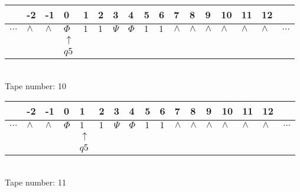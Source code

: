 \documentclass{article}
\begin{document}
\begin{table}[H]
\centering
\begin{tabular}{lllllllllllllllll}
 & -2 & -1 & 0 & 1 & 2 & 3 & 4 & 5 & 6 & 7 & 8 & 9 & 10 & 11 & 12 & \\
\hline
$...$ & \multicolumn{1}{|l|}{$\wedge$} & \multicolumn{1}{|l|}{$\wedge$} & \multicolumn{1}{|l|}{$\Phi$} & \multicolumn{1}{|l|}{$1$} & \multicolumn{1}{|l|}{$1$} & \multicolumn{1}{|l|}{$\Psi$} & \multicolumn{1}{|l|}{$\Phi$} & \multicolumn{1}{|l|}{$1$} & \multicolumn{1}{|l|}{$1$} & \multicolumn{1}{|l|}{$\wedge$} & \multicolumn{1}{|l|}{$\wedge$} & \multicolumn{1}{|l|}{$\wedge$} & \multicolumn{1}{|l|}{$\wedge$} & \multicolumn{1}{|l|}{$\wedge$} & \multicolumn{1}{|l|}{$\wedge$} & $...$\\
\hline
&  &  & $\uparrow$ &  &  &  &  &  &  &  &  &  &  &  &  &  \\
&  &  & $ q5 $ &  &  &  &  &  &  &  &  &  &  &  &  &  \\
\end{tabular}
\\
Tape number: 10
\noindent\makebox[\linewidth]{\hdashrule{\textwidth}{1pt}{1pt}}\end{table}

\begin{table}[H]
\centering
\begin{tabular}{lllllllllllllllll}
 & -2 & -1 & 0 & 1 & 2 & 3 & 4 & 5 & 6 & 7 & 8 & 9 & 10 & 11 & 12 & \\
\hline
$...$ & \multicolumn{1}{|l|}{$\wedge$} & \multicolumn{1}{|l|}{$\wedge$} & \multicolumn{1}{|l|}{$\Phi$} & \multicolumn{1}{|l|}{$1$} & \multicolumn{1}{|l|}{$1$} & \multicolumn{1}{|l|}{$\Psi$} & \multicolumn{1}{|l|}{$\Phi$} & \multicolumn{1}{|l|}{$1$} & \multicolumn{1}{|l|}{$1$} & \multicolumn{1}{|l|}{$\wedge$} & \multicolumn{1}{|l|}{$\wedge$} & \multicolumn{1}{|l|}{$\wedge$} & \multicolumn{1}{|l|}{$\wedge$} & \multicolumn{1}{|l|}{$\wedge$} & \multicolumn{1}{|l|}{$\wedge$} & $...$\\
\hline
&  &  &  & $\uparrow$ &  &  &  &  &  &  &  &  &  &  &  &  \\
&  &  &  & $ q5 $ &  &  &  &  &  &  &  &  &  &  &  &  \\
\end{tabular}
\\
Tape number: 11
\noindent\makebox[\linewidth]{\hdashrule{\textwidth}{1pt}{1pt}}\end{table}
\clearpage
\end{document}
